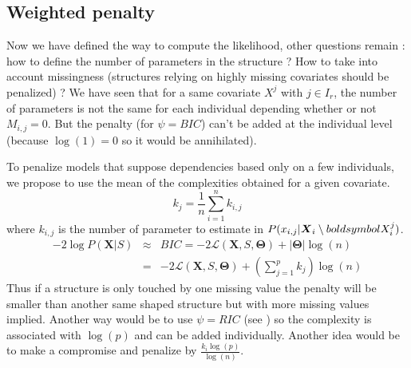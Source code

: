 \documentclass[11pt,a4paper]{report}
\begin{document}
%			
%			
		\subsection{Weighted penalty}
			Now we have defined the way to compute the likelihood, other questions remain : how to define the number of parameters in the structure ?		How to take into account missingness (structures relying on highly missing covariates should be penalized) ?
			We have seen that for a same covariate $X^j$ with $ j \in I_r$, the number of parameters is not the same for each individual depending whether or not $M_{i,j}=0$. But the penalty (for $\psi=BIC$) can't be added at the individual level (because $\log(1)=0$ so it would be annihilated). 
			
			To penalize models that suppose dependencies based only on a few individuals, we propose to use the mean of the complexities obtained for a given covariate.
			\begin{equation}
			k_j=\frac{1}{n}\sum_{i=1}^nk_{i,j}
\end{equation}						where $k_{i,j}$ is the number of parameter to estimate in $P(x_{i,j}|\boldsymbol{X}_i\setminus \\boldsymbol{X}_i^j)$.
			\begin{eqnarray}
		-2\log P(\boldsymbol{X}|S)&\approx & BIC=-2\mathcal{L}(\boldsymbol{X},S,\boldsymbol{\Theta})+|\boldsymbol{\Theta}|\log(n) \\
		&=& -2\mathcal{L}(\boldsymbol{X},S,\boldsymbol{\Theta})+(\sum_{j=1}^pk_j)\log(n)
	\end{eqnarray}
			 Thus if a structure is only touched by one missing value the penalty will be smaller than another same shaped structure but with more missing values implied.
			Another way would be to use $\psi=RIC$ (see \cite{foster1994risk}) so the complexity is associated with $\log(p)$ and can be added individually. Another idea would be to make a compromise and penalize by $\frac{k_i\log(p)}{\log(n)}$.
		
\end{document}
